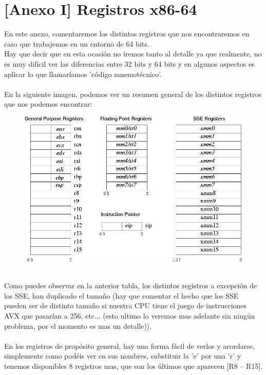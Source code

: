 \documentclass{fennix}
\begin{document}
\section{[Anexo I] Registros x86-64}
En este anexo, comentaremos los distintos registros que nos encontraremos en caso que trabajemos en un entorno de 64 bits.\\
Hay que decir que en esta ocasión no iremos tanto al detalle ya que realmente, no es muy difícil ver las diferencias entre 32 bits y 64 bits y en algunos aspectos es aplicar lo que llamaríamos 'código mnemotécnico'.\\
\\
En la siguiente imagen, podemos ver un resumen general de los distintos registros que nos podemos encontrar:\\
\begin{figure}[h]
	\includegraphics[width=\textwidth]{x86-64}
	\centering
\end{figure}
\\
Como puedes observar en la anterior tabla, los distintos registros a excepción de los SSE, han duplicado el tamaño (hay que comentar el hecho que los SSE pueden ser de distinto tamaño si nuestra CPU tiene el juego de instrucciones AVX que pasarían a 256, etc... (esto ultimo lo veremos mas adelante sin ningún problema, por el momento es mas un detalle)).\\
\\
En los registros de propósito general, hay una forma fácil de verlos y acordarse, simplemente como podéis ver en sus nombres, substituir la 'e' por una 'r' y tenemos disponibles 8 registros mas, que son los últimos que aparecen [R8 – R15].\\
\\
\end{document}
